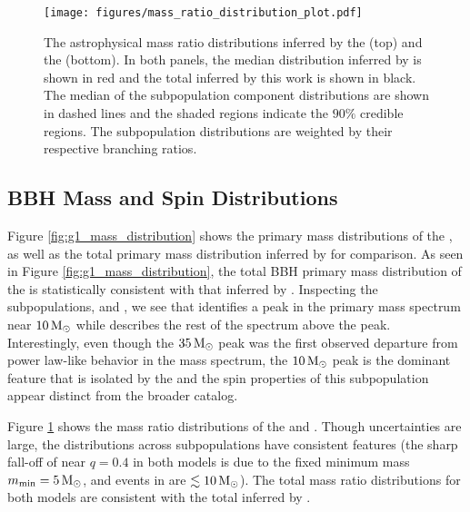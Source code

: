 \begin{figure}[ht!]
    \begin{centering}
        \texttt{[image: figures/mass\_ratio\_distribution\_plot.pdf]}
        \caption{The astrophysical mass ratio distributions inferred by the \base{} (top) and the \comp{} (bottom). In both panels, the median distribution inferred by \brucepaper is shown in red and the total inferred by this work is shown in black. The median of the subpopulation component distributions are shown in dashed lines and the shaded regions indicate the $90\%$ credible regions. The subpopulation distributions are weighted by their respective branching ratios.}
        \label{fig:mass_ratio_distribution}
    \end{centering}
\end{figure}

\subsection{BBH Mass and Spin Distributions}

Figure \ref{fig:g1_mass_distribution} shows the primary mass distributions of the \base{}, as well as the total primary mass distribution inferred by \brucepaper{} for comparison. As seen in Figure \ref{fig:g1_mass_distribution}, the total BBH primary mass distribution of the \base{} is statistically consistent with that inferred by \brucepaper{}. Inspecting the subpopulations, \first{} and \contB{}, we see that \first{} identifies a peak in the primary mass spectrum near $10{\,\rm M}_\odot$ while \contB{} describes the rest of the spectrum above the peak. Interestingly, even though the $35{\,\rm M}_\odot$ peak was the first observed departure from power law-like behavior in the mass spectrum, the $10{\,\rm M}_\odot$ peak is the dominant feature that is isolated by the \comp{} and the spin properties of this subpopulation appear distinct from the broader catalog.

Figure \ref{fig:mass_ratio_distribution} shows the mass ratio distributions of the \base{} and \comp{}. Though uncertainties are large, the distributions across subpopulations have consistent features (the sharp fall-off of \first{} near $q=0.4$ in both models is due to the fixed minimum mass $m_\text{min}=5{\,\rm M}_\odot$, and events in \first{} are $\lesssim10{\,\rm M}_\odot$). The total mass ratio distributions for both models are consistent with the total inferred by \brucepaper.

